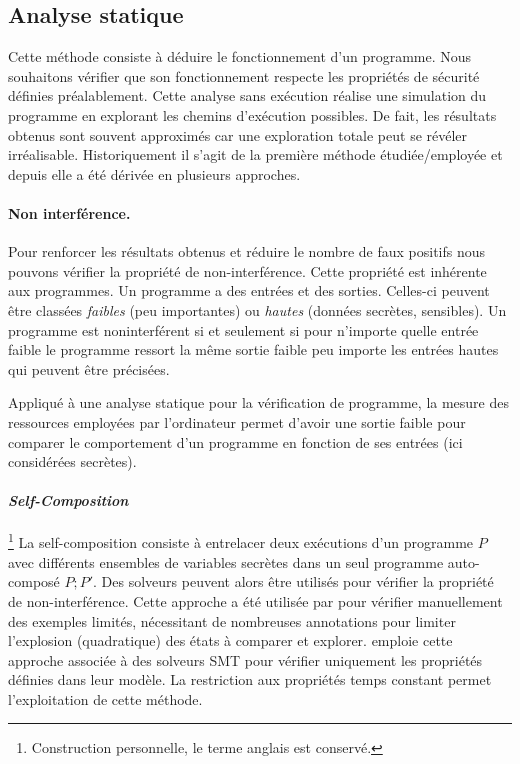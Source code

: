 \subsection*{Analyse statique}

Cette méthode consiste à déduire le fonctionnement d'un programme. Nous souhaitons vérifier que son fonctionnement respecte les propriétés de sécurité définies préalablement. Cette analyse sans exécution réalise une simulation du programme en explorant les chemins d'exécution possibles. De fait, les résultats obtenus sont souvent approximés car une exploration totale peut se révéler irréalisable. Historiquement il s'agit de la première méthode étudiée/employée et depuis elle a été dérivée en plusieurs approches.\medbreak

\paragraph{Non interférence.} Pour renforcer les résultats obtenus et réduire le nombre de faux positifs nous pouvons vérifier la propriété de non-interférence. Cette propriété est inhérente aux programmes. Un programme a des entrées et des sorties. Celles-ci peuvent être classées \textit{faibles} (peu importantes) ou \textit{hautes} (données secrètes, sensibles). Un programme est noninterférent si et seulement si pour n'importe quelle entrée faible le programme ressort la même sortie faible peu importe les entrées hautes qui peuvent être précisées.

Appliqué à une analyse statique pour la vérification de programme, la mesure des ressources employées par l'ordinateur permet d'avoir une sortie faible pour comparer le comportement d'un programme en fonction de ses entrées (ici considérées secrètes).

\paragraph{\textit{Self-Composition}}\footnote{Construction personnelle, le terme anglais est conservé.} La self-composition consiste à entrelacer deux exécutions d'un programme $P$ avec différents ensembles de variables secrètes dans un seul programme auto-composé $P;P'$. Des solveurs peuvent alors être utilisés pour vérifier la propriété de non-interférence. Cette approche a été utilisée par \citeauthor{ABPV13} \cite{ABPV13} pour vérifier manuellement des exemples limités, nécessitant de nombreuses annotations pour limiter l'explosion (quadratique) des états à comparer et explorer. \cite{binsecRel2019} emploie cette approche associée à des solveurs SMT pour vérifier uniquement les propriétés définies dans leur modèle. La restriction aux propriétés temps constant permet l'exploitation de cette méthode.

